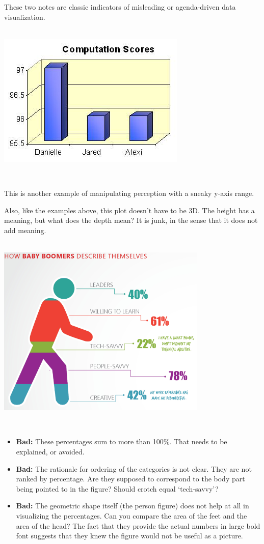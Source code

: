\documentclass[
]{book}
\begin{document}
These two notes are classic indicators of misleading or agenda-driven data visualization.

~\\

\includegraphics{img/vis12.jpg}

~

This is another example of manipulating perception with a sneaky y-axis range.

Also, like the examples above, this plot doesn't have to be 3D. The height has a meaning, but what does the depth mean? It is junk, in the sense that it does not add meaning.

~\\

\includegraphics[width=0.75\textwidth,height=\textheight]{img/vis12.png}

~

\begin{itemize}
\item
  \textbf{Bad:} These percentages sum to more than 100\%. That needs to be explained, or avoided.
\item
  \textbf{Bad:} The rationale for ordering of the categories is not clear. They are not ranked by percentage. Are they supposed to correspond to the body part being pointed to in the figure? Should crotch equal `tech-savvy'?
\item
  \textbf{Bad:} The geometric shape itself (the person figure) does not help at all in visualizing the percentages. Can you compare the area of the feet and the area of the head? The fact that they provide the actual numbers in large bold font suggests that they knew the figure would not be useful as a picture.
\end{itemize}
\end{document}
